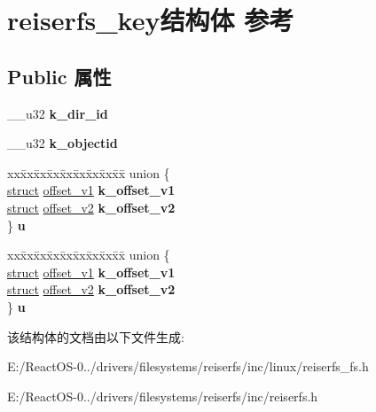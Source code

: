 \hypertarget{structreiserfs__key}{}\section{reiserfs\+\_\+key结构体 参考}
\label{structreiserfs__key}
\subsection*{Public 属性}
\begin{DoxyCompactItemize}
\item 
\mbox{\label{structreiserfs__key_a9837101b6e995ca09cb559fdbfc55561}} 
\+\_\+\+\_\+u32 {\bfseries k\+\_\+dir\+\_\+id}
\item 
\mbox{\label{structreiserfs__key_a5cdd2b7cdc859bef111e75b061a0bda9}} 
\+\_\+\+\_\+u32 {\bfseries k\+\_\+objectid}
\item 
\mbox{\label{structreiserfs__key_a424553416f3e2c6b0fd714ef68a838b6}} 
\begin{tabbing}
xx\=xx\=xx\=xx\=xx\=xx\=xx\=xx\=xx\=\kill
union \{\\
\>\hyperlink{interfacestruct}{struct} \hyperlink{structoffset__v1}{offset\_v1} {\bfseries k\_offset\_v1}\\
\>\hyperlink{interfacestruct}{struct} \hyperlink{structoffset__v2}{offset\_v2} {\bfseries k\_offset\_v2}\\
\} {\bfseries u}\\

\end{tabbing}\item 
\mbox{\label{structreiserfs__key_a2629ce38a701c284c5ba85e015657d5e}} 
\begin{tabbing}
xx\=xx\=xx\=xx\=xx\=xx\=xx\=xx\=xx\=\kill
union \{\\
\>\hyperlink{interfacestruct}{struct} \hyperlink{structoffset__v1}{offset\_v1} {\bfseries k\_offset\_v1}\\
\>\hyperlink{interfacestruct}{struct} \hyperlink{structoffset__v2}{offset\_v2} {\bfseries k\_offset\_v2}\\
\} {\bfseries u}\\

\end{tabbing}\end{DoxyCompactItemize}


该结构体的文档由以下文件生成\+:\begin{DoxyCompactItemize}
\item 
E\+:/\+React\+O\+S-\/0../drivers/filesystems/reiserfs/inc/linux/reiserfs\+\_\+fs.\+h\item 
E\+:/\+React\+O\+S-\/0../drivers/filesystems/reiserfs/inc/reiserfs.\+h\end{DoxyCompactItemize}
